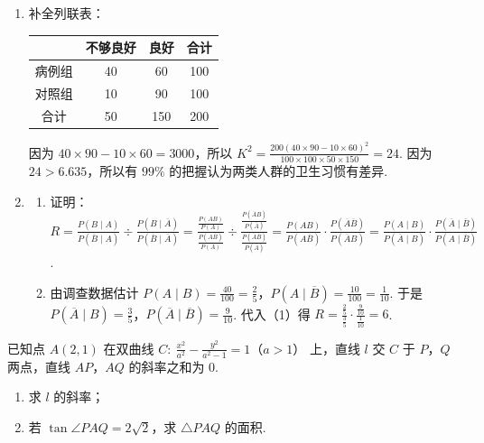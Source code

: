 \begin{solution}
\begin{enumerate}
\item 补全列联表：
{\centering
\begin{tabular}{|c|c|c|c|}
\hline
& 不够良好 & 良好 & 合计 \\
\hline
病例组 & 40 & 60 & 100 \\
\hline
对照组 & 10 & 90 & 100 \\
\hline
合计 & 50 & 150 & 200 \\
\hline
\end{tabular}
\par}
因为 \(40\times 90-10\times 60=3000\)，所以
\(K^2=\frac{200(40\times 90-10\times 60)^2}{100\times 100\times 50\times 150}=24\).
因为 \(24>6.635\)，所以有 \(99\%\) 的把握认为两类人群的卫生习惯有差异.
\item \begin{enumerate}
\item 证明：
\(R=\frac{P(B\mid A)}{P(\overline B\mid A)}\div \frac{P(B\mid \overline A)}{P(\overline B\mid \overline A)}=\frac{\frac{P(AB)}{P(A)}}{\frac{P(A\overline B)}{P(A)}}\div \frac{\frac{P(\overline AB)}{P(\overline A)}}{\frac{P(\overline A\overline B)}{P(\overline A)}}=\frac{P(AB)}{P(A\overline B)}\cdot \frac{P(\overline A\overline B)}{P(\overline AB)}=\frac{P(A\mid B)}{P(\overline A\mid B)}\cdot \frac{P(\overline A\mid \overline B)}{P(A\mid \overline B)}\).
\item 由调查数据估计 \(P(A\mid B)=\frac{40}{100}=\frac25\)，\(P(A\mid \overline B)=\frac{10}{100}=\frac1{10}\).
于是 \(P(\overline A\mid B)=\frac35\)，\(P(\overline A\mid \overline B)=\frac9{10}\).
代入（1）得 \(R=\frac{\frac25}{\frac35}\cdot \frac{\frac9{10}}{\frac1{10}}=6\).
\end{enumerate}
\end{enumerate}
\end{solution}

\begin{problem}
已知点 \(A(2,1)\) 在双曲线 \(C:\ \frac{x^2}{a^2}-\frac{y^2}{a^2-1}=1\)（\(a>1\)） 上，直线 \(l\) 交 \(C\) 于 \(P\)，\(Q\) 两点，直线 \(AP\)，\(AQ\) 的斜率之和为 \(0\).

\begin{enumerate}
\item 求 \(l\) 的斜率；

\item 若 \(\tan \angle PAQ=2\sqrt2\)，求 \(\triangle PAQ\) 的面积.
\end{enumerate}
\end{problem}

